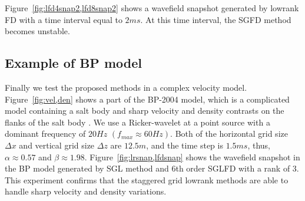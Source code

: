 Figure~\ref{fig:lfd4snap2,lfd8snap2} shows a  wavefield snapshot generated by lowrank FD with a time interval equal to $2 ms$. At this time interval, the SGFD method becomes unstable. 





\subsection{Example of BP model}

Finally we test the proposed methods in a complex velocity model. Figure~\ref{fig:vel,den} shows a part of the BP-2004 model, which is a complicated model containing a salt body and sharp velocity and density contrasts on the flanks of the salt body \cite[]{bp2004}. We use a Ricker-wavelet at a point source with a dominant frequency of $20 Hz$ $(f_{max} \approx 60Hz)$. Both of the horizontal grid size $\Delta x$ and vertical grid size $\Delta z$ are $12.5m$, and the time step is $1.5ms$, thus, $\alpha \approx 0.57$ and $\beta \approx 1.98$. Figure~\ref{fig:lrsnap,lfdsnap} shows the wavefield snapshot in the BP model generated by SGL method and 6th order SGLFD with a rank of 3. This experiment confirms that the staggered grid lowrank methods are able to handle sharp velocity and density variations.   




